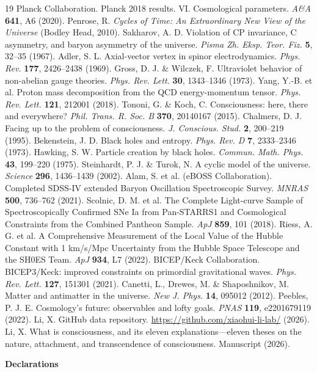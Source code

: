 \documentclass[11pt,a4paper]{article}
\begin{document}
\begin{thebibliography}{19}
 Planck Collaboration. Planck 2018 results. VI. Cosmological parameters. {\it A\&A} {\bf 641}, A6 (2020).
 Penrose, R. {\it Cycles of Time: An Extraordinary New View of the Universe} (Bodley Head, 2010).
 Sakharov, A. D. Violation of CP invariance, C asymmetry, and baryon asymmetry of the universe. {\it Pisma Zh. Eksp. Teor. Fiz.} {\bf 5}, 32--35 (1967).
 Adler, S. L. Axial-vector vertex in spinor electrodynamics. {\it Phys. Rev.} {\bf 177}, 2426--2438 (1969).
 Gross, D. J. \& Wilczek, F. Ultraviolet behavior of non-abelian gauge theories. {\it Phys. Rev. Lett.} {\bf 30}, 1343--1346 (1973).
 Yang, Y.-B. et al. Proton mass decomposition from the QCD energy-momentum tensor. {\it Phys. Rev. Lett.} {\bf 121}, 212001 (2018).
 Tononi, G. \& Koch, C. Consciousness: here, there and everywhere? {\it Phil. Trans. R. Soc. B} {\bf 370}, 20140167 (2015).
 Chalmers, D. J. Facing up to the problem of consciousness. {\it J. Conscious. Stud.} {\bf 2}, 200--219 (1995).
 Bekenstein, J. D. Black holes and entropy. {\it Phys. Rev. D} {\bf 7}, 2333--2346 (1973).
 Hawking, S. W. Particle creation by black holes. {\it Commun. Math. Phys.} {\bf 43}, 199--220 (1975).
 Steinhardt, P. J. \& Turok, N. A cyclic model of the universe. {\it Science} {\bf 296}, 1436--1439 (2002).
 Alam, S. et al. (eBOSS Collaboration). Completed SDSS-IV extended Baryon Oscillation Spectroscopic Survey. {\it MNRAS} {\bf 500}, 736--762 (2021).
 Scolnic, D. M. et al. The Complete Light-curve Sample of Spectroscopically Confirmed SNe Ia from Pan-STARRS1 and Cosmological Constraints from the Combined Pantheon Sample. {\it ApJ} {\bf 859}, 101 (2018).
 Riess, A. G. et al. A Comprehensive Measurement of the Local Value of the Hubble Constant with 1 km/s/Mpc Uncertainty from the Hubble Space Telescope and the SH0ES Team. {\it ApJ} {\bf 934}, L7 (2022).
 BICEP/Keck Collaboration. BICEP3/Keck: improved constraints on primordial gravitational waves. {\it Phys. Rev. Lett.} {\bf 127}, 151301 (2021).
 Canetti, L., Drewes, M. \& Shaposhnikov, M. Matter and antimatter in the universe. {\it New J. Phys.} {\bf 14}, 095012 (2012).
 Peebles, P. J. E. Cosmology's future: observables and lofty goals. {\it PNAS} {\bf 119}, e2201679119 (2022).
 Li, X. GitHub data repository. \url{https://github.com/xiaohui-li-lab/} (2026).
 Li, X. What is consciousness, and its eleven explanations---eleven theses on the nature, attachment, and transcendence of consciousness. Manuscript (2026).
\end{thebibliography}
\textbf{\textbf{Declarations}}
\end{document}

